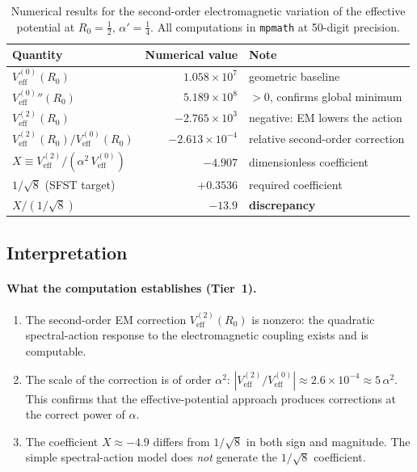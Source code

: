 \begin{table}[h]
\centering
\renewcommand{\arraystretch}{1.3}
\begin{tabular}{lrl}
\toprule
Quantity & Numerical value & Note \\
\midrule
$V_{\mathrm{eff}}^{(0)}(R_0)$ &
  $1.058\times 10^7$ & geometric baseline \\
$V_{\mathrm{eff}}^{(0)}{}''\!(R_0)$ &
  $5.189\times 10^8$ & $>0$, confirms global minimum \\
$V_{\mathrm{eff}}^{(2)}(R_0)$ &
  $-2.765\times 10^3$ & negative: EM lowers the action \\
$V_{\mathrm{eff}}^{(2)}(R_0)/V_{\mathrm{eff}}^{(0)}(R_0)$ &
  $-2.613\times 10^{-4}$ & relative second-order correction \\
$X\equiv V_{\mathrm{eff}}^{(2)}/(\alpha^2\,V_{\mathrm{eff}}^{(0)})$ &
  $-4.907$ & dimensionless coefficient \\
\midrule
$1/\sqrt{8}$ (SFST target) &
  $+0.3536$ & required coefficient \\
$X/(1/\sqrt{8})$ &
  $-13.9$ & \textbf{discrepancy} \\
\bottomrule
\end{tabular}
\caption{Numerical results for the second-order electromagnetic
  variation of the effective potential at $R_0=\tfrac{1}{2}$,
  $\alpha'=\tfrac{1}{4}$.  All computations in \texttt{mpmath} at
  50-digit precision.}
\label{tab:B1results}
\end{table}

\subsection{Interpretation}
\label{ssec:B1interp}

\paragraph{What the computation establishes (Tier~1).}

\begin{enumerate}[label=(\roman*)]
  \item The second-order EM correction $V_{\mathrm{eff}}^{(2)}(R_0)$
        is nonzero: the quadratic spectral-action response to the
        electromagnetic coupling exists and is computable.

  \item The scale of the correction is of order $\alpha^2$:
        $|V_{\mathrm{eff}}^{(2)}/V_{\mathrm{eff}}^{(0)}|
        \approx 2.6\times10^{-4} \approx 5\,\alpha^2$.
        This confirms that the effective-potential approach produces
        corrections at the correct power of $\alpha$.

  \item The coefficient $X\approx -4.9$ differs from $1/\sqrt{8}$
        in both sign and magnitude.  The simple spectral-action
        model does \emph{not} generate the $1/\sqrt{8}$ coefficient.
\end{enumerate}

